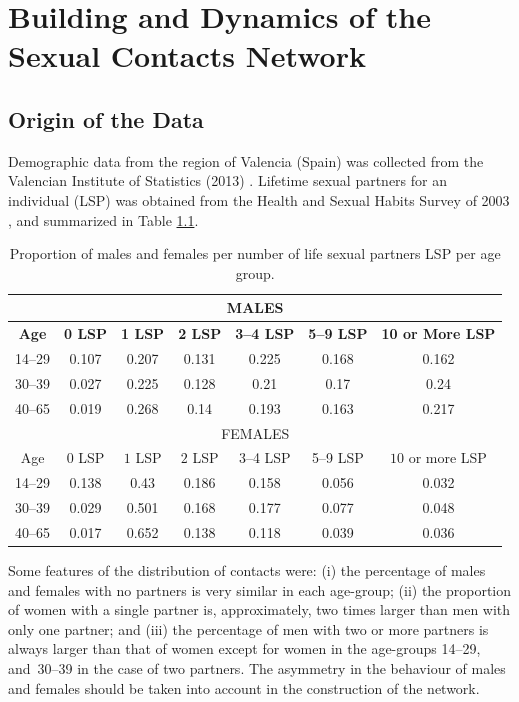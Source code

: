\chapter{Building and Dynamics of the Sexual Contacts Network}\label{ConstruccionYDinamica}

\section{Origin of the Data}

Demographic data from the region of Valencia (Spain) was collected from the Valencian Institute of Statistics (2013)  \cite{IVE}.
Lifetime sexual partners for an individual (LSP) was obtained from the Health and Sexual Habits Survey of 2003 \cite{INE}, and summarized in Table \ref{table1}. 

\begin{table}[H]
\centering
\begin{tabular}{ccccccc}
\toprule
\multicolumn{7}{c}{\textbf{MALES}} \\ \midrule
\textbf{ Age} & \textbf{0 LSP} & \textbf{1 LSP} &\textbf{ 2 LSP} & \textbf{3--4 LSP} & \textbf{5--9 LSP} & \textbf{10 or More LSP} \\
\midrule
14--29 & 0.107 & 0.207 & 0.131 & 0.225 & 0.168 & 0.162 \\
30--39 & 0.027 & 0.225 & 0.128 & 0.21 & 0.17 & 0.24 \\
40--65 & 0.019 & 0.268 & 0.14 & 0.193 & 0.163 & 0.217 \\
 \midrule 
 
\multicolumn{7}{c}{FEMALES} \\ \midrule
  Age & $0$ LSP & $1$ LSP & $2$ LSP & 3--4 LSP & 5--9 LSP & $10$ or more LSP \\
 \midrule
14--29 & 0.138 & 0.43 & 0.186 & 0.158 & 0.056 & 0.032 \\
30--39 & 0.029 & 0.501 & 0.168 & 0.177 & 0.077 & 0.048 \\
40--65 & 0.017 & 0.652 & 0.138 & 0.118 & 0.039 & 0.036 \\
\bottomrule
\end{tabular} 
\caption{Proportion of males and females per number of life sexual partners {LSP} per age group.}
\label{table1} 
\end{table}

Some features of the distribution of contacts were: (i) the percentage of males and females with no partners is
very similar in each age-group; (ii) the proportion of women  with a single partner is, approximately, two times larger than men with only one partner; and (iii) the percentage of men with two or more partners is always larger than that of women except for women in the age-groups 14--29, and~30--39 in the case of two partners. The asymmetry in the behaviour of males and females should be taken into account in the construction of the network.

